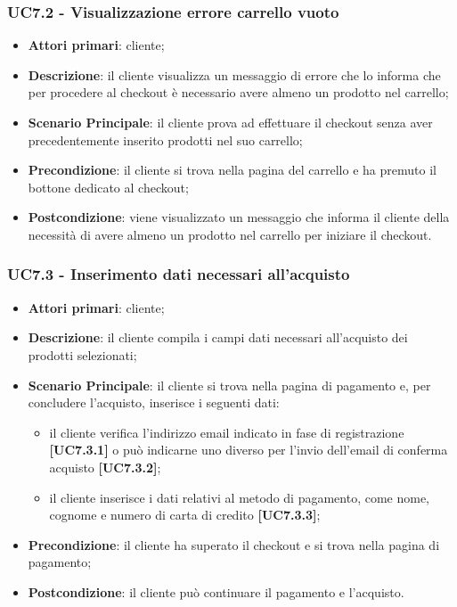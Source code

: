 \subsubsection{UC7.2 - Visualizzazione errore carrello vuoto}
\begin{itemize}
\item \textbf{Attori primari}: cliente;
\item \textbf{Descrizione}: il cliente visualizza un messaggio di errore che lo informa che per procedere al checkout è necessario avere almeno un prodotto nel carrello;
\item \textbf{Scenario Principale}: il cliente prova ad effettuare il checkout senza aver precedentemente inserito prodotti nel suo carrello;
\item \textbf{Precondizione}: il cliente si trova nella pagina del carrello e ha premuto il bottone dedicato al checkout;
\item \textbf{Postcondizione}: viene visualizzato un messaggio che informa il cliente della necessità di avere almeno un prodotto nel carrello per iniziare il checkout.
\end{itemize}

\subsubsection{UC7.3 - Inserimento dati necessari all'acquisto}
\begin{itemize}
\item \textbf{Attori primari}: cliente;
\item \textbf{Descrizione}: il cliente compila i campi dati necessari all'acquisto dei prodotti selezionati;
\item \textbf{Scenario Principale}: il cliente si trova nella pagina di pagamento e, per concludere l'acquisto, inserisce i seguenti dati:
\begin{itemize}
	\item il cliente verifica l'indirizzo email indicato in fase di registrazione \textbf{[UC7.3.1]} o può indicarne uno diverso per l'invio dell'email di conferma acquisto \textbf{[UC7.3.2]};
	\item il cliente inserisce i dati relativi al metodo di pagamento, come nome, cognome e numero di carta di credito \textbf{[UC7.3.3]};
\end{itemize}
\item \textbf{Precondizione}: il cliente ha superato il checkout e si trova nella pagina di pagamento;
\item \textbf{Postcondizione}: il cliente può continuare il pagamento e l'acquisto.
\end{itemize}


